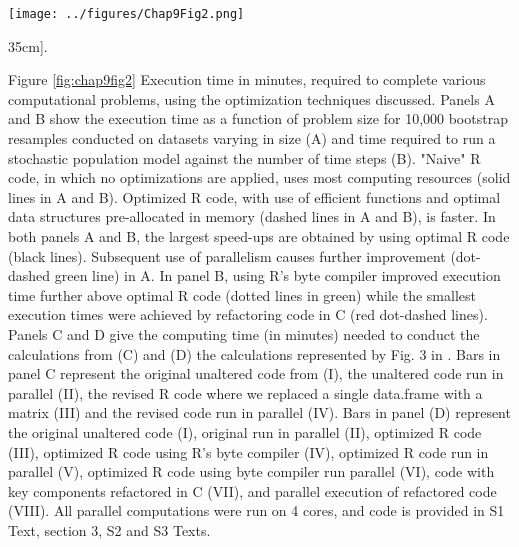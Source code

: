 \documentclass[b5paper,justified]{tufte-book} %
\begin{document}
\begin{fullwidth}
\begin{figure*}
\hspace*{.9cm}\texttt{[image: ../figures/Chap9Fig2.png]}
\caption[Execution time in minutes, required to complete various computational problems][35cm]{.}
\label{fig:chap9fig2}
\vspace*{0.3cm}
\hspace*{1cm} \begin{minipage}{12cm}
\footnotesize Figure \ref{fig:chap9fig2} 
Execution time in minutes, required to complete various computational problems, using the optimization techniques discussed. Panels A
and B show the execution time as a function of problem size for 10,000 bootstrap resamples conducted on datasets varying in size (A) and time required to run a stochastic population model against the number of time steps (B). "Naive" R code, in which no optimizations are applied, uses most computing resources (solid lines in A and B). Optimized R code, with use of efficient functions and optimal data structures pre-allocated in memory (dashed lines in A and B), is faster. In both panels A and B, the largest speed-ups are obtained by using optimal R code (black lines). Subsequent use of parallelism causes further improvement (dot-dashed green line) in A. In panel B, using R's byte compiler improved execution time further above optimal R code (dotted lines in green) while the smallest execution times were achieved by refactoring code in C (red dot-dashed lines). Panels C and D give the computing time (in minutes) needed to conduct the calculations from (C) \citet{Merow2011} and (D) the calculations represented by Fig. 3 in \citet{Visser2011}. Bars in panel C represent the original unaltered code from \citet{Merow2011} (I), the unaltered code run in parallel (II), the revised R code where we replaced a single data.frame with a matrix (III) and the revised code run in parallel (IV). Bars in panel (D) represent the original unaltered code \citet{Visser2011} (I), original run in parallel (II), optimized R code (III), optimized R code using R's byte compiler (IV), optimized R code run in parallel (V), optimized R code using byte compiler run parallel (VI), code with key components refactored in C (VII), and parallel execution of refactored code (VIII). All parallel computations were run on 4 cores, and code is provided in S1 Text, section 3, S2 and S3 Texts.
\end{minipage}
\end{figure*}




\end{fullwidth}
\end{document}
